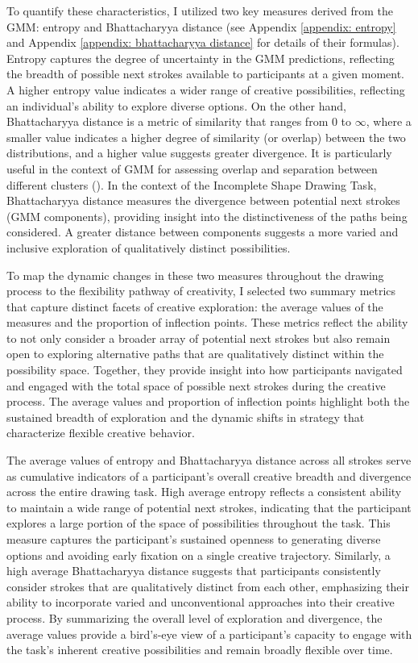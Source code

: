 \documentclass[../MA_Thesis.tex]{subfiles}
\begin{document}
To quantify these characteristics, I utilized two key measures derived from the GMM: entropy and Bhattacharyya distance (see Appendix \ref{appendix: entropy} and Appendix \ref{appendix: bhattacharyya distance} for details of their formulas). Entropy captures the degree of uncertainty in the GMM predictions, reflecting the breadth of possible next strokes available to participants at a given moment. A higher entropy value indicates a wider range of creative possibilities, reflecting an individual's ability to explore diverse options. On the other hand, Bhattacharyya distance is a metric of similarity that ranges from 0 to $\infty$, where a smaller value indicates a higher degree of similarity (or overlap) between the two distributions, and a higher value suggests greater divergence. It is particularly useful in the context of GMM for assessing overlap and separation between different clusters (\cite{alangari_intrinsically_2023}). In the context of the Incomplete Shape Drawing Task, Bhattacharyya distance measures the divergence between potential next strokes (GMM components), providing insight into the distinctiveness of the paths being considered. A greater distance between components suggests a more varied and inclusive exploration of qualitatively distinct possibilities.

To map the dynamic changes in these two measures throughout the drawing process to the flexibility pathway of creativity, I selected two summary metrics that capture distinct facets of creative exploration: the average values of the measures and the proportion of inflection points. These metrics reflect the ability to not only consider a broader array of potential next strokes but also remain open to exploring alternative paths that are qualitatively distinct within the possibility space. Together, they provide insight into how participants navigated and engaged with the total space of possible next strokes during the creative process. The average values and proportion of inflection points highlight both the sustained breadth of exploration and the dynamic shifts in strategy that characterize flexible creative behavior. 

The average values of entropy and Bhattacharyya distance across all strokes serve as cumulative indicators of a participant’s overall creative breadth and divergence across the entire drawing task. High average entropy reflects a consistent ability to maintain a wide range of potential next strokes, indicating that the participant explores a large portion of the space of possibilities throughout the task. This measure captures the participant’s sustained openness to generating diverse options and avoiding early fixation on a single creative trajectory. Similarly, a high average Bhattacharyya distance suggests that participants consistently consider strokes that are qualitatively distinct from each other, emphasizing their ability to incorporate varied and unconventional approaches into their creative process. By summarizing the overall level of exploration and divergence, the average values provide a bird’s-eye view of a participant’s capacity to engage with the task’s inherent creative possibilities and remain broadly flexible over time.
\end{document}
